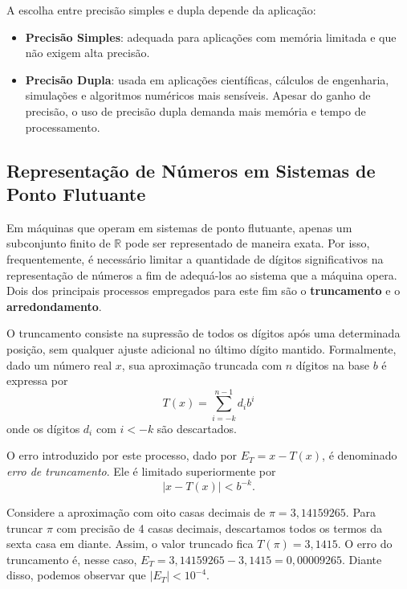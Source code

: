 A escolha entre precisão simples e dupla depende da aplicação:



\begin{itemize}
  \item \textbf{Precisão Simples}: adequada para aplicações com memória limitada e que não exigem alta precisão.
  \item \textbf{Precisão Dupla}: usada em aplicações científicas, cálculos de engenharia, simulações e algoritmos numéricos mais sensíveis.
Apesar do ganho de precisão, o uso de precisão dupla demanda mais memória e tempo de processamento.
\end{itemize}

\subsection{Representação de Números em Sistemas de Ponto Flutuante}

Em máquinas que operam em sistemas de ponto flutuante, apenas um subconjunto finito de \(\mathbb{R} \) pode ser representado de maneira exata. Por isso, frequentemente, é necessário limitar a quantidade de dígitos significativos na representação de números a fim de  adequá-los ao sistema que a máquina opera. Dois dos principais processos empregados para este fim são o \textbf{truncamento} e o \textbf{arredondamento}.

O truncamento consiste na supressão de todos os dígitos após uma determinada posição, sem qualquer ajuste adicional no último dígito mantido. Formalmente, dado um número real \( x \), sua aproximação truncada com \( n \) dígitos na base \( b \) é expressa por
\[
T(x) = \sum_{i = -k}^{n-1} d_i b^i
\]
onde os dígitos \( d_i \) com \( i < -k \) são descartados.

O erro introduzido por este processo, dado por $E_T = x-T(x)$, é denominado \textit{erro de truncamento}. Ele é limitado superiormente por
\begin{equation}
    |x - T(x)| < b^{-k}.
\end{equation}
\begin{ex}
Considere a aproximação com oito casas decimais de \(\pi = 3,14159265\).
Para truncar $\pi$  com precisão de 4 casas decimais, descartamos todos os termos da sexta casa em diante. Assim, o valor truncado fica
$T(\pi) = 3,1415$.
O erro do truncamento é, nesse caso, $E_T = 3,14159265 - 3,1415 = 0,00009265$. Diante disso, podemos observar que $|E_T| < 10^{-4}$.
\end{ex}

